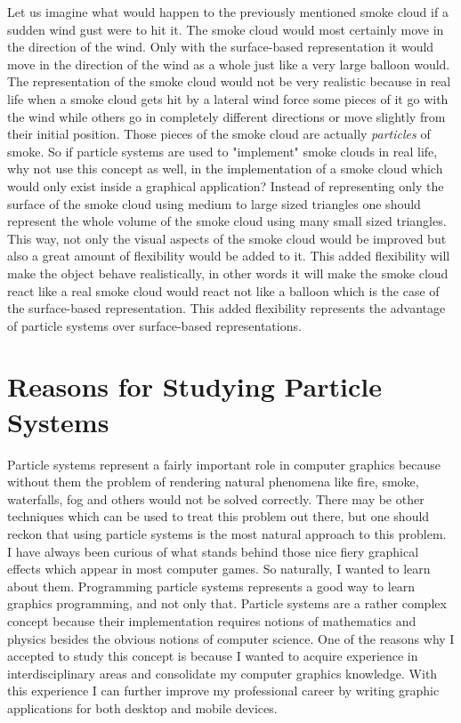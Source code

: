 Let us imagine what would happen to the previously mentioned smoke cloud if a sudden wind gust were to hit it. The smoke cloud would most certainly move in the direction of the wind. Only with the surface-based representation it would move in the direction of the wind as a whole just like a very large balloon would. The representation of the smoke cloud would not be very realistic because in real life when a smoke cloud gets hit by a lateral wind force some pieces of it go with the wind while others go in completely different directions or move slightly from their initial position. Those pieces of the smoke cloud are actually \textit{particles} of smoke. So if particle systems are used to "implement" smoke clouds in real life, why not use this concept as well, in the implementation of a smoke cloud which would only exist inside a graphical application? Instead of representing only the surface of the smoke cloud using medium to large sized triangles one should represent the whole volume of the smoke cloud using many small sized triangles. This way, not only the visual aspects of the smoke cloud would be improved but also a great amount of flexibility would be added to it. This added flexibility will make the object behave realistically, in other words it will make the smoke cloud react like a real smoke cloud would react not like a balloon which is the case of the surface-based representation. This added flexibility represents the advantage of particle systems over surface-based representations.\\
\newpage
\section{Reasons for Studying Particle Systems}
Particle systems represent a fairly important role in computer graphics because without them the problem of rendering natural phenomena like fire, smoke, waterfalls, fog and others would not be solved correctly. There may be other techniques which can be used to treat this problem out there, but one should reckon that using particle systems is the most natural approach to this problem.\\

I have always been curious of what stands behind those nice fiery graphical effects which appear in most computer games. So naturally, I wanted to learn about them. Programming particle systems represents a good way to learn graphics programming, and not only that. Particle systems are a rather complex concept because their implementation requires notions of mathematics and physics besides the obvious notions of computer science. One of the reasons why I accepted to study this concept is because I wanted to acquire experience in interdisciplinary areas and consolidate my computer graphics knowledge. With this experience I can further improve my professional career by writing graphic applications for both desktop and mobile devices.\\

